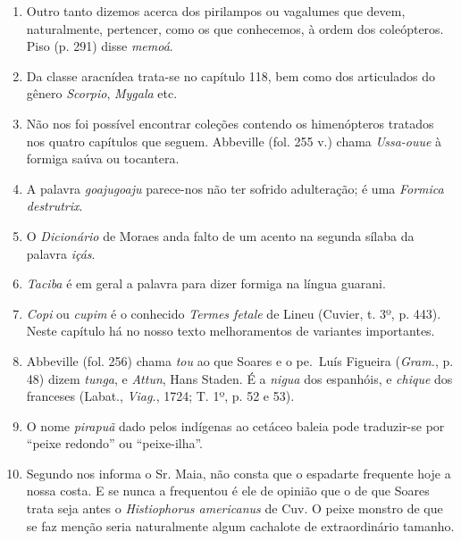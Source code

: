 \begin{enumerate}
\item Outro tanto dizemos acerca dos pirilampos ou vagalumes que devem, 
naturalmente, pertencer, como os que conhecemos, à ordem dos coleópteros. Piso 
(p. 291) disse \textit{memoá}.

\item Da classe aracnídea trata-se no capítulo 118, bem como dos articulados do 
gênero \textit{Scorpio}, \textit{Mygala} etc.

\item Não nos foi possível encontrar coleções contendo os himenópteros tratados nos 
quatro capítulos que seguem. Abbeville (fol. 255 v.) chama \textit{Ussa-ouue} à formiga 
saúva ou tocantera.

\item A palavra \textit{goajugoaju} parece-nos não ter sofrido adulteração; é uma \textit{Formica destrutrix}.

\item O \textit{Dicionário} de Moraes anda falto de um acento na segunda sílaba da palavra \textit{içás}.

\item  \textit{Taciba} é em geral a palavra para dizer formiga na língua guarani.

\item \textit{Copi} ou \textit{cupim} é o conhecido \textit{Termes fetale} de Lineu (Cuvier, t. 3º, p. 443). 
Neste capítulo há no nosso texto melhoramentos de variantes importantes.

\item Abbeville (fol. 256) chama \textit{tou} ao que Soares e o pe.~Luís Figueira (\textit{Gram.}, p. 48) 
dizem \textit{tunga}, e \textit{Attun}, Hans Staden. É a \textit{nigua} dos espanhóis, e \textit{chique} dos franceses 
(Labat., \textit{Viag.}, 1724; T. 1º, p. 52 e 53).

\item O nome \textit{pirapuã} dado pelos indígenas ao cetáceo baleia pode traduzir-se por ``peixe redondo'' ou ``peixe-ilha''. 

\item Segundo nos informa o Sr. Maia, não consta que o espadarte frequente hoje a 
nossa costa. E se nunca a frequentou é ele de opinião que o de que Soares trata seja 
antes o \textit{Histiophorus americanus} de Cuv. O peixe monstro de que se faz menção seria 
naturalmente algum cachalote de extraordinário tamanho.


\end{enumerate}
